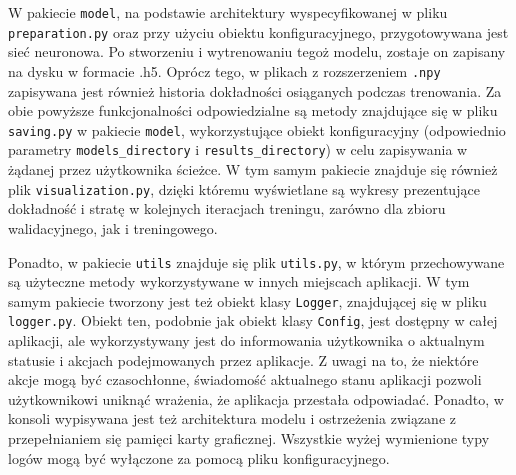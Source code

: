 W pakiecie \verb|model|, na podstawie architektury wyspecyfikowanej w pliku \verb|preparation.py| oraz przy użyciu obiektu konfiguracyjnego, przygotowywana jest sieć neuronowa. Po stworzeniu i wytrenowaniu tegoż modelu, zostaje on zapisany na dysku w formacie .h5. Oprócz tego, w plikach z rozszerzeniem \verb|.npy| zapisywana jest również historia dokładności osiąganych podczas trenowania. Za obie powyższe funkcjonalności odpowiedzialne są metody znajdujące się w pliku \verb|saving.py| w pakiecie \verb|model|, wykorzystujące obiekt konfiguracyjny (odpowiednio parametry \verb|models_directory| i \verb|results_directory|) w celu zapisywania w żądanej przez użytkownika ścieżce. W tym samym pakiecie znajduje się również plik \verb|visualization.py|, dzięki któremu wyświetlane są wykresy prezentujące dokładność i stratę w kolejnych iteracjach treningu, zarówno dla zbioru walidacyjnego, jak i treningowego.

Ponadto, w pakiecie \verb|utils| znajduje się plik \verb|utils.py|, w którym przechowywane są użyteczne metody wykorzystywane w innych miejscach aplikacji. W tym samym pakiecie tworzony jest też obiekt klasy \verb|Logger|, znajdującej się w pliku \verb|logger.py|. Obiekt ten, podobnie jak obiekt klasy \verb|Config|, jest dostępny w całej aplikacji, ale wykorzystywany jest do informowania użytkownika o aktualnym statusie i akcjach podejmowanych przez aplikacje. Z uwagi na to, że niektóre akcje mogą być czasochłonne, świadomość aktualnego stanu aplikacji pozwoli użytkownikowi uniknąć wrażenia, że aplikacja przestała odpowiadać. Ponadto, w konsoli wypisywana jest też architektura modelu i ostrzeżenia związane z przepełnianiem się pamięci karty graficznej. Wszystkie wyżej wymienione typy logów mogą być wyłączone za pomocą pliku konfiguracyjnego.

